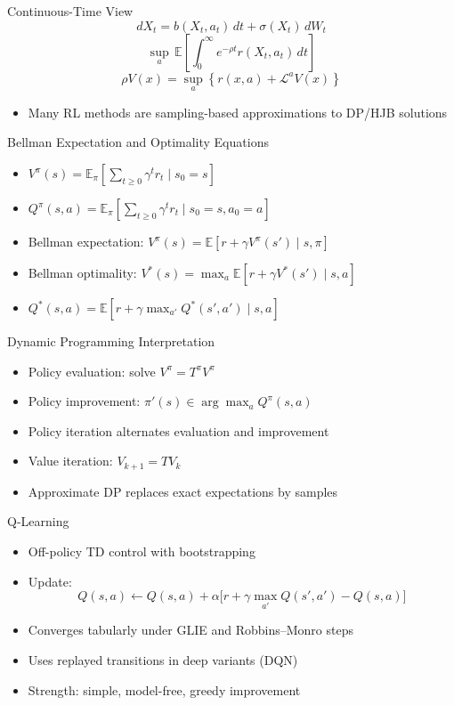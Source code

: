 \documentclass[aspectratio=169]{beamer}
\begin{document}
\begin{frame}{Continuous-Time View}
\[
dX_t=b(X_t,a_t)\,dt+\sigma(X_t)\,dW_t
\]
\[
\sup_a\,\mathbb{E}\!\left[\int_0^\infty e^{-\rho t}r(X_t,a_t)\,dt\right]
\]
\[
\rho V(x)=\sup_a\left\{r(x,a)+\mathcal L^aV(x)\right\}
\]
\begin{itemize}
  \item Many RL methods are sampling-based approximations to DP/HJB solutions
\end{itemize}
\end{frame}

\begin{frame}{Bellman Expectation and Optimality Equations}
\begin{itemize}
  \item $V^\pi(s)=\mathbb{E}_\pi\!\left[\sum_{t\ge 0}\gamma^t r_t\mid s_0=s\right]$
  \item $Q^\pi(s,a)=\mathbb{E}_\pi\!\left[\sum_{t\ge 0}\gamma^t r_t\mid s_0=s,a_0=a\right]$
  \item Bellman expectation: $V^\pi(s)=\mathbb{E}[r+\gamma V^\pi(s')\mid s,\pi]$
  \item Bellman optimality: $V^*(s)=\max_a\mathbb{E}[r+\gamma V^*(s')\mid s,a]$
  \item $Q^*(s,a)=\mathbb{E}[r+\gamma\max_{a'}Q^*(s',a')\mid s,a]$
\end{itemize}
\end{frame}

\begin{frame}{Dynamic Programming Interpretation}
\begin{itemize}
  \item Policy evaluation: solve $V^\pi=T^\pi V^\pi$
  \item Policy improvement: $\pi'(s)\in\arg\max_a Q^\pi(s,a)$
  \item Policy iteration alternates evaluation and improvement
  \item Value iteration: $V_{k+1}=TV_k$
  \item Approximate DP replaces exact expectations by samples
\end{itemize}
\end{frame}

\begin{frame}{Q-Learning}
\begin{itemize}
  \item Off-policy TD control with bootstrapping
  \item Update:
  \[
  Q(s,a)\leftarrow Q(s,a)+\alpha\big[r+\gamma\max_{a'}Q(s',a')-Q(s,a)\big]
  \]
  \item Converges tabularly under GLIE and Robbins--Monro steps
  \item Uses replayed transitions in deep variants (DQN)
  \item Strength: simple, model-free, greedy improvement
\end{itemize}
\end{frame}
\end{document}
